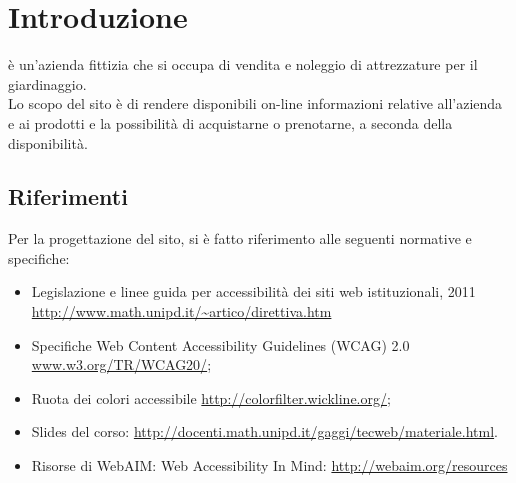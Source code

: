 \section{Introduzione}{
	\textbf{\ggt}  è un'azienda fittizia che si occupa di vendita e noleggio di attrezzature per il giardinaggio. \\
	Lo scopo del sito è di rendere disponibili on-line informazioni relative all'azienda e ai prodotti e la possibilità di acquistarne o prenotarne, a seconda della disponibilità. 
	
    \subsection{Riferimenti}{
		Per la progettazione del sito, si è fatto riferimento alle seguenti normative e specifiche:
		\begin{itemize}\itemsep0.5pt
			\item Legislazione e linee guida per accessibilità dei siti web istituzionali, 2011 \url{http://www.math.unipd.it/~artico/direttiva.htm}
			\item Specifiche Web Content Accessibility Guidelines (WCAG) 2.0 \url{www.w3.org/TR/WCAG20/};
			\item Ruota dei colori accessibile \url{http://colorfilter.wickline.org/};
			\item Slides del corso: \url{http://docenti.math.unipd.it/gaggi/tecweb/materiale.html}.
			\item Risorse di WebAIM: Web Accessibility In Mind: \url{http://webaim.org/resources}
		\end{itemize}
    }
}
